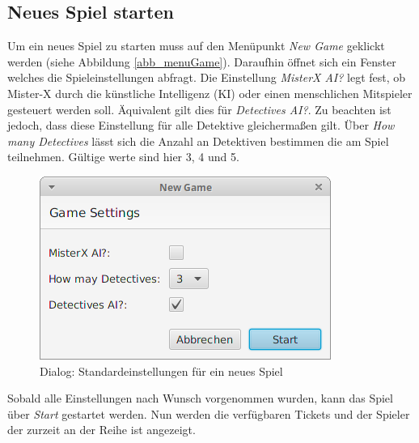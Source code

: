         \subsection{Neues Spiel starten}
            Um ein neues Spiel zu starten muss auf den Menüpunkt \textit{New Game} geklickt werden (siehe Abbildung \ref{abb_menuGame}).
            Daraufhin öffnet sich ein Fenster welches die Spieleinstellungen abfragt.
            Die Einstellung \textit{MisterX AI?} legt fest, ob Mister-X durch die künstliche Intelligenz (KI)
            oder einen menschlichen Mitspieler gesteuert werden soll. Äquivalent gilt dies für \textit{Detectives AI?}. 
            Zu beachten ist jedoch, dass diese Einstellung für alle Detektive gleichermaßen gilt.
            Über \textit{How many Detectives} lässt sich die Anzahl an Detektiven bestimmen die am Spiel teilnehmen.
            Gültige werte sind hier 3, 4 und 5.

            \begin{figure}[H]
                \centering
                \includegraphics[scale=0.7]{img/benutzerhandbuch/settings.png}   
                \caption{Dialog: Standardeinstellungen für ein neues Spiel}
                \label{abb_settings}
            \end{figure}
            Sobald alle Einstellungen nach Wunsch vorgenommen wurden, kann das Spiel über \textit{Start} gestartet werden.
            Nun werden die verfügbaren Tickets und der Spieler der zurzeit an der Reihe ist angezeigt.
            
